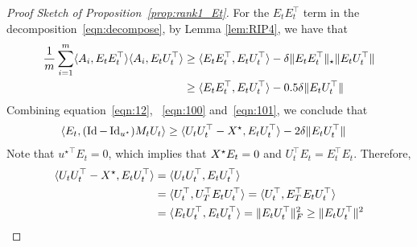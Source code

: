 \begin{proof}[Proof Sketch of Proposition~\ref{prop:rank1_Et}]
	For the $E_tE_t^\top$ term in the decomposition~\eqref{eqn:decompose}, by Lemma \ref{lem:RIP4}, we have that 
	\begin{align}
 	\frac 1 m \sum_{i=1}^m \langle A_i, E_t E_t^{\top}\rangle \langle A_i, E_t U_t^{\top}\rangle &\ge \langle E_t E_t^{\top}, E_t U_t^{\top}\rangle -\delta \|E_t E_t^{\top}\|_\star\|E_tU_t^\top\|	\nonumber \\
& 	\ge \langle E_t E_t^{\top}, E_t U_t^{\top}\rangle - 0.5\delta \|E_tU_t^\top\|	\label{eqn:101}
 	\end{align}
 	Combining equation~\eqref{eqn:12}, ~\eqref{eqn:100} and~\eqref{eqn:101}, we conclude that 
 	\begin{align} \langle E_t, (\operatorname{Id} - \operatorname{Id}_{{u^{\star}}}) M_t U_t\rangle 
	&\ge \langle U_t U_t^{\top} - {X}^\star, E_t U_t^{\top}\rangle - 2\delta \|E_t U_t^{\top}\|\label{eqn:103}
	\end{align}
	Note that ${u^\star}^\top E_t = 0$, which implies that ${X}^\star E_t = 0$ and $U_t^\top E_t = E_t^\top E_t$. Therefore, 
	\begin{align*}
	\langle U_t U_t^{\top} - {X}^\star, E_t U_t^{\top}\rangle &  = \langle U_t U_t^{\top} , E_t U_t^{\top}\rangle \\
	& = \langle U_t^{\top} , U_T^\top E_t U_t^{\top}\rangle = \langle U_t^{\top} , E_T^\top E_t U_t^{\top}\rangle \\
	& = \langle E_tU_t^{\top} ,  E_t U_t^{\top}\rangle = \|E_t U_t^{\top}\|_F^2 \ge \|E_t U_t^{\top}\|^2
	\end{align*}


\end{proof}
